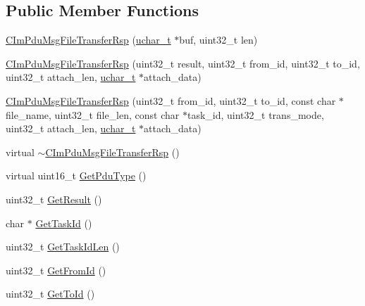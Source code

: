 \subsection*{Public Member Functions}
\begin{DoxyCompactItemize}
\item 
\hyperlink{class_c_im_pdu_msg_file_transfer_rsp_a54e3205afcf986c9aa741d38c129dfca}{C\+Im\+Pdu\+Msg\+File\+Transfer\+Rsp} (\hyperlink{base_2ostype_8h_a124ea0f8f4a23a0a286b5582137f0b8d}{uchar\+\_\+t} $\ast$buf, uint32\+\_\+t len)
\item 
\hyperlink{class_c_im_pdu_msg_file_transfer_rsp_a187fdff5d57e6fdb8a6b4e3e1a08772c}{C\+Im\+Pdu\+Msg\+File\+Transfer\+Rsp} (uint32\+\_\+t result, uint32\+\_\+t from\+\_\+id, uint32\+\_\+t to\+\_\+id, uint32\+\_\+t attach\+\_\+len, \hyperlink{base_2ostype_8h_a124ea0f8f4a23a0a286b5582137f0b8d}{uchar\+\_\+t} $\ast$attach\+\_\+data)
\item 
\hyperlink{class_c_im_pdu_msg_file_transfer_rsp_a4194dd6691499733228e87aec02f57d9}{C\+Im\+Pdu\+Msg\+File\+Transfer\+Rsp} (uint32\+\_\+t from\+\_\+id, uint32\+\_\+t to\+\_\+id, const char $\ast$file\+\_\+name, uint32\+\_\+t file\+\_\+len, const char $\ast$task\+\_\+id, uint32\+\_\+t trans\+\_\+mode, uint32\+\_\+t attach\+\_\+len, \hyperlink{base_2ostype_8h_a124ea0f8f4a23a0a286b5582137f0b8d}{uchar\+\_\+t} $\ast$attach\+\_\+data)
\item 
virtual \hyperlink{class_c_im_pdu_msg_file_transfer_rsp_ad2630f6077d4eefeefbd0a31de5f6ac5}{$\sim$\+C\+Im\+Pdu\+Msg\+File\+Transfer\+Rsp} ()
\item 
virtual uint16\+\_\+t \hyperlink{class_c_im_pdu_msg_file_transfer_rsp_ac9ca939d214efcf9dd43d5e24af428e3}{Get\+Pdu\+Type} ()
\item 
uint32\+\_\+t \hyperlink{class_c_im_pdu_msg_file_transfer_rsp_a86233239ce3ec50259d22b90d21ac48d}{Get\+Result} ()
\item 
char $\ast$ \hyperlink{class_c_im_pdu_msg_file_transfer_rsp_ae6288a007c9b2ee22a0691ddf68ababd}{Get\+Task\+Id} ()
\item 
uint32\+\_\+t \hyperlink{class_c_im_pdu_msg_file_transfer_rsp_a9108be47fb328a326baeb9a0facdc585}{Get\+Task\+Id\+Len} ()
\item 
uint32\+\_\+t \hyperlink{class_c_im_pdu_msg_file_transfer_rsp_aa3f24239cf18227a99c21fe939a38e58}{Get\+From\+Id} ()
\item 
uint32\+\_\+t \hyperlink{class_c_im_pdu_msg_file_transfer_rsp_a187a7b00ab99c1ae5434e0195932cd67}{Get\+To\+Id} ()
\item 

\end{DoxyCompactItemize}
